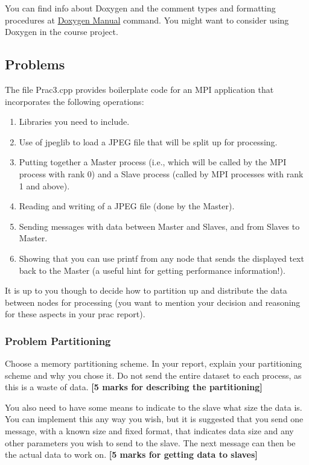 You can find info about Doxygen and the comment types and formatting procedures at \href{https://www.doxygen.nl/index.html}{Doxygen Manual} command. You might want to consider using Doxygen in the course project.

\subsection{Problems}

The file Prac3.cpp provides boilerplate code for an MPI application that incorporates the following operations:

\begin{enumerate}
	\item Libraries you need to include.
	\item Use of jpeglib to load a JPEG file that will be split up for processing.
	\item Putting together a Master process (i.e., which will be called by the MPI process with rank 0) and a Slave process (called by MPI processes with rank 1 and above).
	\item Reading and writing of a JPEG file (done by the Master).
	\item Sending messages with data between Master and Slaves, and from Slaves to Master.
	\item Showing that you can use printf from any node that sends the displayed text back to the Master (a useful hint for getting performance information!). 
\end{enumerate}

It is up to you though to decide how to partition up and distribute the data between nodes for processing (you want to mention your decision and reasoning for these aspects in your prac report).

\subsubsection{Problem Partitioning}
Choose a memory partitioning scheme. In your report, explain your partitioning scheme and why you chose it. Do not send the entire dataset to each process, as this is a waste of data. \textbf{[5 marks for describing the partitioning]}

You also need to have some means to indicate to the slave what size the data is. You can implement this any way you wish, but it is suggested that you send one message, with a known size and fixed format, that indicates data size and any other parameters you wish to send to the slave. The next message can then be the actual data to work on. \textbf{[5 marks for getting data to slaves]}

